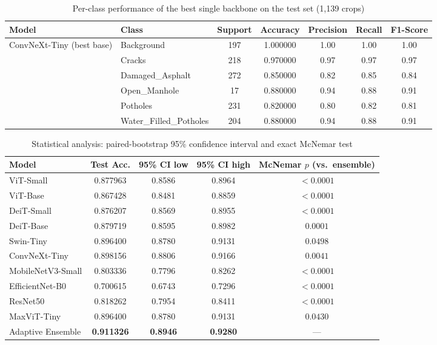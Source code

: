 \documentclass{article}
\begin{document}
\begin{table}[htbp]
\centering
\caption{Per-class performance of the best single backbone on the test set (1{,}139 crops)}
\label{tab:per_class_model_performance}
\begin{tabular}{llccccc}
\toprule
\textbf{Model} & \textbf{Class} & \textbf{Support} & \textbf{Accuracy} & \textbf{Precision} & \textbf{Recall} & \textbf{F1-Score} \\
\midrule
\multirow{6}{*}{ConvNeXt-Tiny (best base)}
& Background             & 197 & 1.000000 & 1.00 & 1.00 & 1.00 \\
& Cracks                 & 218 & 0.970000 & 0.97 & 0.97 & 0.97 \\
& Damaged\_Asphalt       & 272 & 0.850000 & 0.82 & 0.85 & 0.84 \\
& Open\_Manhole          & 17  & 0.880000 & 0.94 & 0.88 & 0.91 \\
& Potholes               & 231 & 0.820000 & 0.80 & 0.82 & 0.81 \\
& Water\_Filled\_Potholes & 204 & 0.880000 & 0.94 & 0.88 & 0.91 \\
\bottomrule
\end{tabular}
\end{table}

\begin{table}[ht]
\centering
\caption{Statistical analysis: paired-bootstrap 95\% confidence interval and exact McNemar test}
\label{tab:statistical}
\setlength{\tabcolsep}{6pt}
\renewcommand{\arraystretch}{1.15}
\begin{tabular}{lcccc}
\toprule
\textbf{Model} & \textbf{Test Acc.} & \textbf{95\% CI low} & \textbf{95\% CI high} & \textbf{McNemar $p$ (vs.\ ensemble)} \\
\toprule
ViT-Small         & 0.877963 & 0.8586 & 0.8964 & $<0.0001$ \\
ViT-Base          & 0.867428 & 0.8481 & 0.8859 & $<0.0001$ \\
DeiT-Small        & 0.876207 & 0.8569 & 0.8955 & $<0.0001$ \\
DeiT-Base         & 0.879719 & 0.8595 & 0.8982 & $0.0001$ \\
Swin-Tiny         & 0.896400 & 0.8780 & 0.9131 & $0.0498$ \\
ConvNeXt-Tiny     & 0.898156 & 0.8806 & 0.9166 & $0.0041$ \\
MobileNetV3-Small & 0.803336 & 0.7796 & 0.8262 & $<0.0001$ \\
EfficientNet-B0   & 0.700615 & 0.6743 & 0.7296 & $<0.0001$ \\
ResNet50          & 0.818262 & 0.7954 & 0.8411 & $<0.0001$ \\
MaxViT-Tiny       & 0.896400 & 0.8780 & 0.9131 & $0.0430$ \\
Adaptive Ensemble & \textbf{0.911326} & \textbf{0.8946} & \textbf{0.9280} & --- \\
\bottomrule
\end{tabular}
\end{table}
\end{document}
